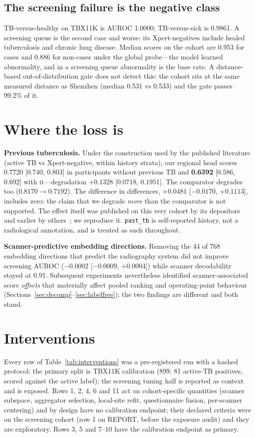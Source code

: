 \documentclass[11pt,a4paper]{article}
\newcommand{\ci}[2]{[$#1$, $#2$]}
\newcommand{\code}[1]{\texttt{#1}}
\begin{document}
\subsection{The screening failure is the negative class}\label{sec:negclass}
TB-versus-healthy on TBX11K is AUROC 1.0000; TB-versus-sick is 0.9861. A screening queue is the second case and worse: its Xpert-negatives include healed tuberculosis and chronic lung disease. Median scores on the cohort are 0.953 for cases and 0.886 for non-cases under the global probe---the model learned abnormality, and in a screening queue abnormality is the base rate. A distance-based out-of-distribution gate does not detect this: the cohort sits at the same measured distance as Shenzhen (median 0.531 vs 0.533) and the gate passes 99.2\% of it.

\section{Where the loss is}\label{sec:loss}
\textbf{Previous tuberculosis.} Under the construction used by the published literature (active TB vs Xpert-negative, within history strata), our regional head scores 0.7720 \ci{0.740}{0.803} in participants without previous TB and \textbf{0.6392} \ci{0.586}{0.692} with it---degradation \textbf{$+0.1328$} \ci{0.0718}{0.1951}. The comparator degrades too ($0.8170 \rightarrow 0.7192$). The difference in differences, \textbf{$+0.0481$} \ci{-0.0170}{+0.1113}, includes zero: the claim that we degrade \emph{more} than the comparator is not supported. The effect itself was published on this very cohort by its depositors~\cite{codlin2025} and earlier by others~\cite{kagujje2023,qin2024}; we reproduce it. \code{past\_tb} is self-reported history, not a radiological annotation, and is treated as such throughout.

\textbf{Scanner-predictive embedding directions.} Removing the 44 of 768 embedding directions that predict the radiography system did not improve screening AUROC ($-0.0002$ \ci{-0.0009}{+0.0004}) while scanner decodability stayed at 0.91. Subsequent experiments nevertheless identified scanner-associated score \emph{offsets} that materially affect pooled ranking and operating-point behaviour (Sections~\ref{sec:decomp}--\ref{sec:labelfree}); the two findings are different and both stand.

\section{Interventions}\label{sec:interventions}
Every row of Table~\ref{tab:interventions} was a pre-registered run with a hashed protocol; the primary split is TBX11K calibration (899; 81 active-TB positives, scored against the active label); the screening tuning half is reported as context and is exposed. Rows 1, 2, 4, 6 and 11 act on cohort-specific quantities (scanner subspace, aggregator selection, local-site refit, questionnaire fusion, per-scanner centering) and by design have no calibration endpoint; their declared criteria were on the screening cohort (row 1 on REPORT, before the exposure audit) and they are exploratory. Rows 3, 5 and 7--10 have the calibration endpoint as primary.
\end{document}
